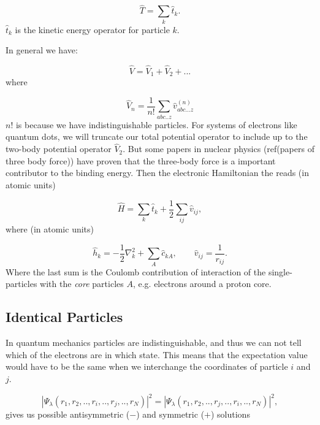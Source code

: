 \begin{equation}
\hat{T} = \sum_{k} \hat{t}_k.
 \label{eq:kinetic}
\end{equation}
%
$\hat{t}_k$ is the kinetic energy operator for particle $k$. 

In general we have:

\begin{equation}
 \hat{V} = \hat{V}_1 + \hat{V}_2 + ...  
 \label{eq:potential}
\end{equation}
where 

\begin{equation}
 \hat{V}_n = \frac{1}{n!} \sum_{abc..z} \hat{v}^{(n)}_{abc...z}
\end{equation}
$n!$ is because we have indistinguishable particles. For systems of electrons like quantum dots, we will truncate our total potential operator to include up to the two-body potential operator $\hat{V}_2$. But some papers in nuclear physics (ref(papers of three body force)) have proven that the three-body force is a important contributor to the binding energy. Then the electronic Hamiltonian the reads (in atomic units)

\begin{equation}
\hat{H} = \sum_{k} \hat{t}_k + \frac{1}{2} \sum_{ij} \hat{v}_{ij},
 \label{def:electronic hamiltonian}
\end{equation}
%
where (in atomic units)

\begin{equation}
\hat{h}_k = -\frac{1}{2}\nabla^2_k + \sum_{A} \hat{c}_{kA}, \qquad \hat{v}_{ij} = \frac{1}{r_{ij}}.
 \label{def:electronic hamiltonian parts}
\end{equation}
%
Where the last sum is the Coulomb contribution of interaction of the single-particles with the \emph{core} particles $A$, e.g. electrons around a proton core. 


\subsection{Identical Particles}
In quantum mechanics particles are indistinguishable, and thus we can not tell which of the electrons are in which state. This means that the expectation value would have to be the same when we interchange the coordinates of particle $i$ and $j$. 

\begin{equation}
|\Psi_{\lambda}(r_1,r_2,..,r_i,..,r_j,..,r_N)|^2 = |\Psi_{\lambda}(r_1,r_2,..,r_j,..,r_i,..,r_N)|^2,
 \label{eq:interchange}
\end{equation}
%
gives us possible antisymmetric ($-$) and symmetric ($+$) solutions

